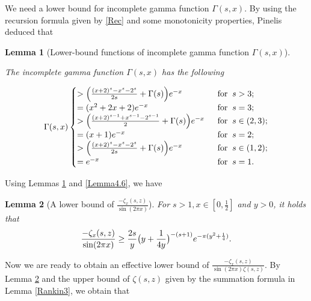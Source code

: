 \documentclass[reqno,english]{amsart}
\newtheorem{lemma}{Lemma}[section]
\newtheorem{open problem}{Open Problem}[section]
\newtheorem{open question}{Open Question}[section]
\newtheorem{open questions on hexagonal lattice}{Open Questions on hexagonal lattice}[section]
\begin{document}
We need a lower bound for incomplete gamma function $\Gamma(s,x)$. By using the recursion formula given by \eqref{Rec} and some monotonicity properties, Pinelis \cite{Pin2020} deduced that
\begin{lemma}[Lower-bound functions of incomplete gamma function $\Gamma(s,x)$]\label{Lemma4.7}

The incomplete gamma function $\Gamma(s,x)$ has the following

 \begin{equation}\aligned\nonumber
\Gamma(s,x)
\begin{cases}
>\Big(
\frac{(x+2)^s-x^s-2^s}{2s}+\Gamma(s)
\Big)e^{-x}\;\;&\hbox{for}\;\; s>3;\\
=(x^2+2x+2)e^{-x}\;\;&\hbox{for}\;\; s=3;\\
>\Big(
\frac{(x+2)^{s-1}+x^{s-1}-2^{s-1}}{2}+\Gamma(s)
\Big)e^{-x}\;\;&\hbox{for}\;\; s\in(2,3);\\
=(x+1)e^{-x}\;\;&\hbox{for}\;\; s=2;\\
>\Big(
\frac{(x+2)^s-x^s-2^s}{2s}+\Gamma(s)
\Big)e^{-x}\;\;&\hbox{for}\;\; s\in(1,2);\\
=e^{-x}\;\;&\hbox{for}\;\; s=1.\\
\end{cases}
\endaligned\end{equation}


\end{lemma}

Using Lemmas \ref{Lemma4.7} and \ref{Lemma4.6}, we have


\begin{lemma}[A lower bound of $\frac{-\zeta_x(s,z)}{\sin(2\pi x)}$]\label{Lemma4.8}
For $s>1, x\in[0,\frac{1}{2}]$ and $y>0$, it holds that
 \begin{equation}\aligned\nonumber
\frac{-\zeta_x(s,z)}{\sin(2\pi x)}\geq\frac{2s}{y}
\big(
 y+\frac{1}{4y}
\big)^{-(s+1)} e^{-\pi(y^2+\frac{1}{4})}.
\endaligned\end{equation}


\end{lemma}
Now we are ready to obtain an effective lower bound of $\frac{-\zeta_x(s,z)}{\sin(2\pi x)\zeta(s,z)}$.
By Lemma \ref{Lemma4.8} and the upper bound of $\zeta(s,z)$ given by the summation formula in Lemma \ref{Rankin3}, we obtain that
\end{document}
